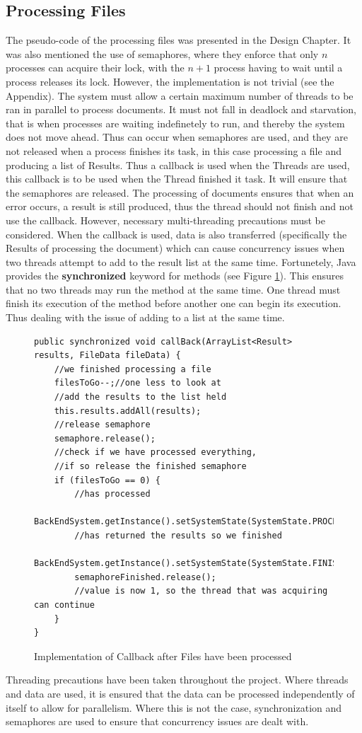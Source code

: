 \subsection{Processing Files}
\par The pseudo-code of the processing files was presented in the Design Chapter. It was also mentioned the use of semaphores, where they enforce that only $n$ processes can acquire their lock, with the $n+1$ process having to wait until a process releases its lock. However, the implementation is not trivial (see the Appendix). The system must allow a certain maximum number of threads to be ran in parallel to process documents. It must not fall in deadlock and starvation, that is when processes are waiting indefinetely to run, and thereby the system does not move ahead. Thus can occur when semaphores are used, and they are not released when a process finishes its task, in this case processing a file and producing a list of Results. Thus a callback is used when the Threads are used, this callback is to be used when the Thread finished it task. It will ensure that the semaphores are released. The processing of documents ensures that when an error occurs, a result is still produced, thus the thread should not finish and not use the callback. However, necessary multi-threading precautions must be considered. When the callback is used, data is also transferred (specifically the Results of processing the document) which can cause concurrency issues when two threads attempt to add to the result list at the same time. Fortunetely, Java provides the \textbf{synchronized} keyword for methods (see Figure \ref{fig:callbackFilesImplemented}). This ensures that no two threads may run the method at the same time. One thread must finish its execution of the method before another one can begin its execution. Thus dealing with the issue of adding to a list at the same time. 
\begin{figure}[H]
\begin{lstlisting}
public synchronized void callBack(ArrayList<Result> results, FileData fileData) {
    //we finished processing a file
    filesToGo--;//one less to look at
    //add the results to the list held
    this.results.addAll(results);
    //release semaphore
    semaphore.release();
    //check if we have processed everything, 
    //if so release the finished semaphore
    if (filesToGo == 0) {
        //has processed
        BackEndSystem.getInstance().setSystemState(SystemState.PROCESSED);
        //has returned the results so we finished
        BackEndSystem.getInstance().setSystemState(SystemState.FINISHED);
        semaphoreFinished.release();
	    //value is now 1, so the thread that was acquiring can continue
    }
}
\end{lstlisting}
\caption{Implementation of Callback after Files have been processed}
\label{fig:callbackFilesImplemented}
\end{figure}
\par Threading precautions have been taken throughout the project. Where threads and data are used, it is ensured that the data can be processed independently of itself to allow for parallelism. Where this is not the case, synchronization and semaphores are used to ensure that concurrency issues are dealt with.
